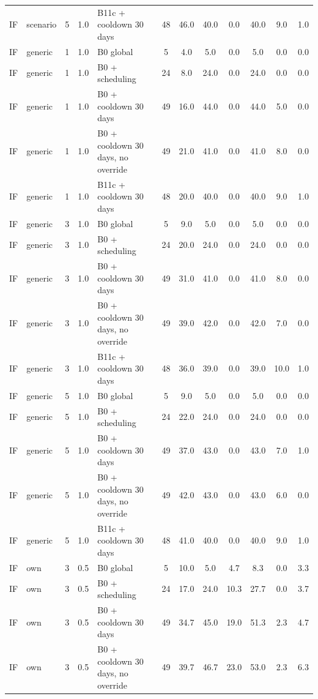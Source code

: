 \documentclass[10pt,onecolumn,letterpaper]{article}
\begin{document}
\begin{longtable}{lllllccccccc}
IF & scenario & 5 & 1.0 & B11c + cooldown 30 days & 48 & 46.0 & 40.0 & 0.0 & 40.0 & 9.0 & 1.0 \\
IF & generic & 1 & 1.0 & B0 global & 5 & 4.0 & 5.0 & 0.0 & 5.0 & 0.0 & 0.0 \\
IF & generic & 1 & 1.0 & B0 + scheduling & 24 & 8.0 & 24.0 & 0.0 & 24.0 & 0.0 & 0.0 \\
IF & generic & 1 & 1.0 & B0 + cooldown 30 days & 49 & 16.0 & 44.0 & 0.0 & 44.0 & 5.0 & 0.0 \\
IF & generic & 1 & 1.0 & B0 + cooldown 30 days, no override & 49 & 21.0 & 41.0 & 0.0 & 41.0 & 8.0 & 0.0 \\
IF & generic & 1 & 1.0 & B11c + cooldown 30 days & 48 & 20.0 & 40.0 & 0.0 & 40.0 & 9.0 & 1.0 \\
IF & generic & 3 & 1.0 & B0 global & 5 & 9.0 & 5.0 & 0.0 & 5.0 & 0.0 & 0.0 \\
IF & generic & 3 & 1.0 & B0 + scheduling & 24 & 20.0 & 24.0 & 0.0 & 24.0 & 0.0 & 0.0 \\
IF & generic & 3 & 1.0 & B0 + cooldown 30 days & 49 & 31.0 & 41.0 & 0.0 & 41.0 & 8.0 & 0.0 \\
IF & generic & 3 & 1.0 & B0 + cooldown 30 days, no override & 49 & 39.0 & 42.0 & 0.0 & 42.0 & 7.0 & 0.0 \\
IF & generic & 3 & 1.0 & B11c + cooldown 30 days & 48 & 36.0 & 39.0 & 0.0 & 39.0 & 10.0 & 1.0 \\
IF & generic & 5 & 1.0 & B0 global & 5 & 9.0 & 5.0 & 0.0 & 5.0 & 0.0 & 0.0 \\
IF & generic & 5 & 1.0 & B0 + scheduling & 24 & 22.0 & 24.0 & 0.0 & 24.0 & 0.0 & 0.0 \\
IF & generic & 5 & 1.0 & B0 + cooldown 30 days & 49 & 37.0 & 43.0 & 0.0 & 43.0 & 7.0 & 1.0 \\
IF & generic & 5 & 1.0 & B0 + cooldown 30 days, no override & 49 & 42.0 & 43.0 & 0.0 & 43.0 & 6.0 & 0.0 \\
IF & generic & 5 & 1.0 & B11c + cooldown 30 days & 48 & 41.0 & 40.0 & 0.0 & 40.0 & 9.0 & 1.0 \\
IF & own & 3 & 0.5 & B0 global & 5 & 10.0 & 5.0 & 4.7 & 8.3 & 0.0 & 3.3 \\
IF & own & 3 & 0.5 & B0 + scheduling & 24 & 17.0 & 24.0 & 10.3 & 27.7 & 0.0 & 3.7 \\
IF & own & 3 & 0.5 & B0 + cooldown 30 days & 49 & 34.7 & 45.0 & 19.0 & 51.3 & 2.3 & 4.7 \\
IF & own & 3 & 0.5 & B0 + cooldown 30 days, no override & 49 & 39.7 & 46.7 & 23.0 & 53.0 & 2.3 & 6.3 \\

\end{longtable}
\end{document}
